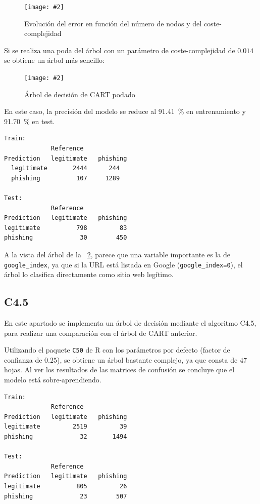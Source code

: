 \documentclass[12pt, a4paper]{article}
\newcommand*{\figref}[1]{\figurename~\ref{fig:#1}}
\newcommand{\figcaption}[4][H]{
  \begin{figure}[#1]
    \centering
    \texttt{[image: \#2]}
    \caption{#3}
    \label{fig:#2}
  \end{figure}
}
\begin{document}
      \figcaption{cart_cp.png}{Evolución del error en función del número de nodos y del coste-complejidad}{1}

      Si se realiza una poda del árbol con un parámetro de coste-complejidad de $0.014$ se obtiene un árbol más sencillo:

      \figcaption{cart_pruned.png}{Árbol de decisión de CART podado}{1}

      En este caso, la precisión del modelo se reduce al \SI{91.41}{\percent} en entrenamiento y \SI{91.70}{\percent} en test.

      \begin{verbatim}
Train:
             Reference
Prediction   legitimate   phishing
  legitimate       2444      244
  phishing          107     1289

Test:
             Reference
Prediction   legitimate   phishing
legitimate          798         83
phishing             30        450
      \end{verbatim}

      A la vista del árbol de la \figref{cart_pruned.png}, parece que una variable importante es la de \texttt{google\_index}, ya que si la URL está listada en Google (\texttt{google\_index=0}), el árbol lo clasifica directamente como sitio web legítimo.

    \subsection{C4.5}

      En este apartado se implementa un árbol de decisión mediante el algoritmo C4.5, para realizar una comparación con el árbol de CART anterior.

      Utilizando el paquete \texttt{C50} de R con los parámetros por defecto (factor de confianza de $0.25$), se obtiene un árbol bastante complejo, ya que consta de $47$ hojas. Al ver los resultados de las matrices de confusión se concluye que el modelo está sobre-aprendiendo.

      \begin{verbatim}
Train:
             Reference
Prediction   legitimate   phishing
legitimate         2519         39
phishing             32       1494

Test:
             Reference
Prediction   legitimate   phishing
legitimate          805         26
phishing             23        507
      \end{verbatim}
\end{document}
